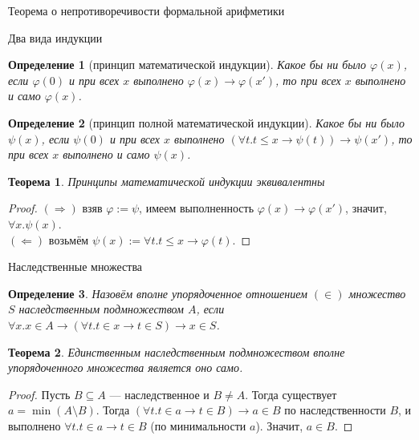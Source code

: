 \documentclass[aspectratio=169]{beamer}
\newtheorem{thm}{Теорема}[section]
\newtheorem{dfn}{Определение}[section]
\begin{document}
\newcommand\doubleplus{+\kern-1.3ex+\kern0.8ex}
\newcommand\mdoubleplus{\ensuremath{\mathbin{+\mkern-10mu+}}}

\begin{frame}{}
\LARGE\begin{center}Теорема о непротиворечивости формальной арифметики\end{center}
\end{frame}

\begin{frame}{Два вида индукции}
\begin{dfn}[принцип математической индукции]
Какое бы ни было $\varphi(x)$, если $\varphi(0)$ и при всех $x$ выполнено $\varphi(x)\rightarrow \varphi(x')$, то
при всех $x$ выполнено и само $\varphi(x)$.
\end{dfn}

\begin{dfn}[принцип полной математической индукции]
Какое бы ни было $\psi(x)$, если $\psi(0)$ и при всех $x$ выполнено $(\forall t.t \leq x \rightarrow \psi(t))\rightarrow \psi(x')$, то
при всех $x$ выполнено и само $\psi(x)$.
\end{dfn}

\begin{thm}Принципы математической индукции эквивалентны\end{thm}
\begin{proof}
$(\Rightarrow)$ взяв $\varphi := \psi$, имеем выполненность $\varphi(x)\rightarrow\varphi(x')$, значит, $\forall x.\psi(x)$. \pause\\
$(\Leftarrow)$ возьмём $\psi(x) := \forall t.t\le x\rightarrow\varphi(t)$.
\end{proof}
\end{frame}

\begin{frame}{Наследственные множества}
\begin{dfn} Назовём вполне упорядоченное отношением $(\in)$ множество $S$ наследственным подмножеством $A$, если 
$\forall x.x \in A \rightarrow (\forall t.t \in x \rightarrow t \in S) \rightarrow x \in S$.
\end{dfn}
\begin{thm}Единственным наследственным подмножеством вполне упорядоченного множества является оно само.\end{thm}
\begin{proof}Пусть $B \subseteq A$ --- наследственное и $B \ne A$.
Тогда существует $a = \min (A \setminus B)$. Тогда $(\forall t.t \in a \rightarrow t \in B) \rightarrow a \in B$ по наследственности $B$,
и выполнено $\forall t.t \in a \rightarrow t \in B$ (по минимальности $a$). Значит, $a \in B$.
\end{proof}
\end{frame}
\end{document}
